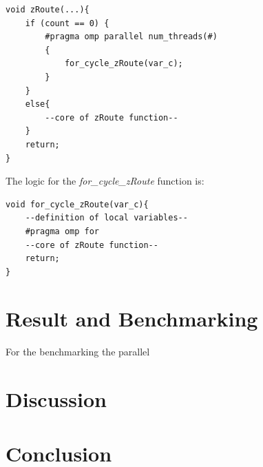 \documentclass[11pt,conference]{IEEEtran}
\begin{document}
\begin{lstlisting}
void zRoute(...){
    if (count == 0) {
    	#pragma omp parallel num_threads(#)
    	{
    		for_cycle_zRoute(var_c);
    	}
    }
    else{
    	--core of zRoute function--
    }
    return;
}
\end{lstlisting}

The logic for the \textit{for\_cycle\_zRoute} function is:

\begin{lstlisting}
void for_cycle_zRoute(var_c){
    --definition of local variables--
    #pragma omp for
    --core of zRoute function--
    return;
}
\end{lstlisting}
\section{Result and Benchmarking}
For the benchmarking the parallel

\section{Discussion}


\section{Conclusion}




\end{document}
